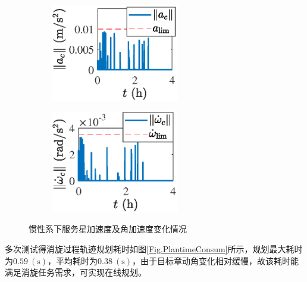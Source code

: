 \documentclass[lang=chs, degree=master, blindreview=false, winfonts=true]{yanputhesis}
\begin{document}
\begin{figure}[htb!]
	\centering
	\begin{minipage}[t]{0.96\textwidth}
			\centering
			\begin{subfigure}[t]{0.47\textwidth}
					\centering
					\includegraphics[width = 2.2in]{picture/chaser_detumble_acc.eps}
					\caption{ }
					\label{fig:detumble_acc_c}
				\end{subfigure}
			\begin{subfigure}[t]{0.47\textwidth}
					\centering
					\includegraphics[width = 2.2in]{picture/chaser_detumble_ang_acc.eps}
					\caption{ }
					\label{fig:detumble_angacc_c}
				\end{subfigure}
		\end{minipage}
	\caption{惯性系下服务星加速度及角加速度变化情况\label{Fig.detumble_Acc_C}}
\end{figure}

多次测试得消旋过程轨迹规划耗时如图\ref{Fig.PlantimeConsum}所示，规划最大耗时为$0.59\ (\mathrm{s})$，平均耗时为$0.38\ (\mathrm{s})$，由于目标章动角变化相对缓慢，故该耗时能满足消旋任务需求，可实现在线规划。
\end{document}
